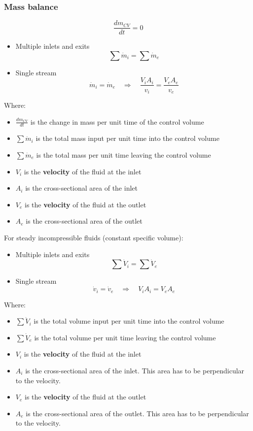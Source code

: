 \documentclass[11pt]{article}
\begin{document}
\subsubsection{Mass balance}
\label{sec:orga8a163d}
\[\frac{dm_{CV}}{dt} = 0\]

\begin{itemize}
\item Multiple inlets and exits
\[\sum \dot{m}_i = \sum \dot{m}_e\]

\item Single stream
\[\dot{m}_i = \dot{m}_e \quad \Rightarrow \quad \frac{V_i A_i}{v_i} = \frac{V_e A_e}{v_e}\]
\end{itemize}

Where:
\begin{itemize}
\item \(\frac{dm_{CV}}{dt}\) is the change in mass per unit time of the control volume
\item \(\sum \dot{m}_i\) is the total mass input per unit time into the control volume
\item \(\sum \dot{m}_e\) is the total mass per unit time leaving the control volume
\item \(V_i\) is the \textbf{velocity} of the fluid at the inlet
\item \(A_i\) is the cross-sectional area of the inlet
\item \(V_e\) is the \textbf{velocity} of the fluid at the outlet
\item \(A_e\) is the cross-sectional area of the outlet
\end{itemize}

\newpage

For steady incompressible fluids (constant specific volume):

\begin{itemize}
\item Multiple inlets and exits
\[\sum \dot{V}_i = \sum \dot{V}_e\]

\item Single stream
\[\dot{v}_i = \dot{v}_e \quad \Rightarrow \quad V_i A_i = V_e A_e\]
\end{itemize}

Where:
\begin{itemize}
\item \(\sum \dot{V}_i\) is the total volume input per unit time into the control volume
\item \(\sum \dot{V}_e\) is the total volume per unit time leaving the control volume
\item \(V_i\) is the \textbf{velocity} of the fluid at the inlet
\item \(A_i\) is the cross-sectional area of the inlet. This area has to be perpendicular to the velocity.
\item \(V_e\) is the \textbf{velocity} of the fluid at the outlet
\item \(A_e\) is the cross-sectional area of the outlet. This area has to be perpendicular to the velocity.
\end{itemize}
\end{document}
